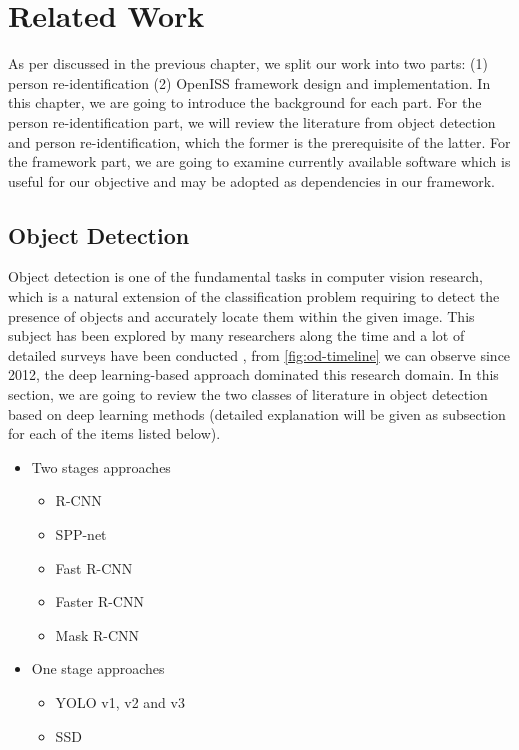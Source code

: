 \chapter{Related Work}
\label{chap:RelatedWork}


As per discussed in the previous chapter, we split our work into two parts: (1)
person re-identification (2) OpenISS framework design and implementation. In
this chapter, we are going to introduce the background for each part. For the
person re-identification part, we will review the literature from object
detection and person re-identification, which the former is the prerequisite of
the latter. For the framework part, we are going to examine currently available
software which is useful for our objective and may be adopted as dependencies
in our framework.


\section{Object Detection}
\label{sec:related_work_obj_det}

Object detection is one of the fundamental tasks in computer vision research,
which is a natural extension of the classification problem requiring to detect the
presence of objects and accurately locate them within the given image.
This subject has been explored by many researchers along the time and a lot of
detailed surveys have been conducted
\cite{survey1-on-dl-od-2018, survey2-on-dl-od-2018}, from
\autoref{fig:od-timeline} we can observe since 2012, the deep learning-based
approach dominated this research domain.
In this section, we are going to review the two classes of literature in object
detection based on deep learning methods (detailed explanation will be given as
subsection for each of the items listed below).

\begin{itemize}
    \item Two stages approaches
    \begin{itemize}
        \item R-CNN
        \item SPP-net
        \item Fast R-CNN
        \item Faster R-CNN
        \item Mask R-CNN
    \end{itemize}

    \item One stage approaches
    \begin{itemize}
        \item YOLO v1, v2 and v3
        \item SSD
    \end{itemize}
\end{itemize}

